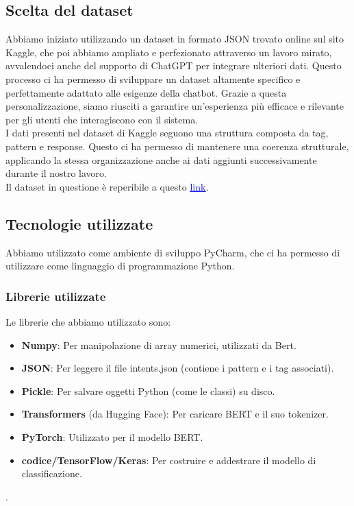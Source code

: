 \documentclass[12pt, letterpaper]{article}
\begin{document}
\subsection{Scelta del dataset}
Abbiamo iniziato utilizzando un dataset in formato JSON trovato online sul sito Kaggle, che poi abbiamo ampliato e perfezionato attraverso un lavoro mirato, avvalendoci anche del supporto di ChatGPT per integrare ulteriori dati. Questo processo ci ha permesso di sviluppare un dataset altamente specifico e perfettamente adattato alle esigenze della chatbot. Grazie a questa personalizzazione, siamo riusciti a garantire un’esperienza più efficace e rilevante per gli utenti che interagiscono con il sistema.\\
I dati presenti nel dataset di Kaggle seguono una struttura composta da tag, pattern e response. Questo ci ha permesso di mantenere una coerenza strutturale, applicando la stessa organizzazione anche ai dati aggiunti successivamente durante il nostro lavoro.\\
Il dataset in questione è reperibile a questo \href{https://www.kaggle.com/code/jocelyndumlao/chatbot-for-mental-health-conversations}{\textcolor{blue}{\underline{link}}}.

\subsection{Tecnologie utilizzate}
Abbiamo utilizzato come ambiente di sviluppo PyCharm, che ci ha permesso di utilizzare come linguaggio di programmazione Python. 

\subsubsection{Librerie utilizzate}
Le librerie che abbiamo utilizzato sono:
\begin{itemize}
	\item \textbf{Numpy}: Per manipolazione di array numerici, utilizzati da Bert.
	
	\item \textbf{JSON}: Per leggere il file intents.json (contiene i pattern e i tag associati).
	
	\item \textbf{Pickle}: Per salvare oggetti Python (come le classi) su disco.
	
	\item \textbf{Transformers} (da Hugging Face): Per caricare BERT e il suo tokenizer.
	
	\item \textbf{PyTorch}: Utilizzato per il modello BERT.
	
	\item \textbf{codice/TensorFlow/Keras}: Per costruire e addestrare il modello di classificazione.
	
\end{itemize}.
\end{document}
